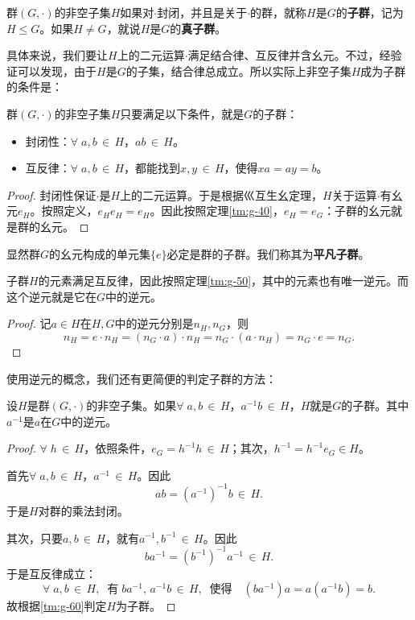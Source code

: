 \documentclass[12pt,UTF8,fontset=none]{ctexbook}
\begin{document}
\vspace{16pt}
\begin{df}[\textbf{子群}]
    群$(G,\cdot)$的非空子集$H$如果对$\cdot$封闭，并且是关于$\cdot$的群，就称$H$是$G$的\textbf{子群}，记为$H\leq G$。如果$H\neq G$，就说$H$是$G$的\textbf{真子群}。
\end{df}
具体来说，我们要让$H$上的二元运算$\cdot$满足结合律、互反律并含幺元。不过，经验证可以发现，由于$H$是$G$的子集，结合律总成立。所以实际上非空子集$H$成为子群的条件是：
\begin{tm} \label{tm:g-60}  
    群$(G,\cdot)$的非空子集$H$只要满足以下条件，就是$G$的子群：
    \begin{itemize}
        \item 封闭性：$\forall\;a,b\,\in\, H$，$ab \,\in\, H$。
        \item 互反律：$\forall\;a,b\,\in\, H$，都能找到$x,y\,\in\,H$，使得$xa = ay = b$。
    \end{itemize}
\end{tm}

\begin{proof}
    封闭性保证$\cdot$是$H$上的二元运算。于是根据巛互生幺定理，$H$关于运算$\cdot$有幺元$e_H$。按照定义，$e_He_H = e_H$。因此按照定理\ref{tm:g-40}，$e_H = e_G$：子群的幺元就是群的幺元。
\end{proof}

显然群$G$的幺元构成的单元集$\{e\}$必定是群的子群。我们称其为\textbf{平凡子群}。

子群$H$的元素满足互反律，因此按照定理\ref{tm:g-50}，其中的元素也有唯一逆元。而这个逆元就是它在$G$中的逆元。
\begin{proof}
    记$a\in H$在$H, G$中的逆元分别是$n_H,n_G$，则
    $$ n_H = e\cdot n_H = (n_G\cdot a)\cdot n_H = n_G\cdot (a\cdot n_H) = n_G\cdot e = n_G.$$
\end{proof}

使用逆元的概念，我们还有更简便的判定子群的方法：
\begin{tm} \label{tm:g-70}   
    设$H$是群$(G,\cdot)$的非空子集。如果$\forall\;a,b\,\in\, H$，$a^{-1}b\,\in\,H$，$H$就是$G$的子群。其中$a^{-1}$是$a$在$G$中的逆元。
\end{tm}
\begin{proof}
    $\forall \; h\,\in\,H$，依照条件，$e_G = h^{-1}h \,\in\, H$；其次，$h^{-1} = h^{-1}e_G\in H$。
    
    首先$\forall\;a,b\,\in\, H$，$a^{-1}\,\in\, H$。因此
    $$ ab = \left(a^{-1}\right)^{-1}b\, \in\, H. $$
    于是$H$对群的乘法封闭。

    其次，只要$a,b\,\in\, H$，就有$a^{-1}, b^{-1}\,\in\, H$。因此
    $$ba^{-1} = \left(b^{-1}\right)^{-1}a^{-1}\,\in\, H.$$
    于是互反律成立：
    $$ \forall \; a,b\,\in\,H, \;\;\mbox{有}\;ba^{-1},\,a^{-1}b\,\in\,H,\;\;\mbox{使得}\quad (ba^{-1})a = a(a^{-1}b) = b. $$
    故根据\ref{tm:g-60}判定$H$为子群。
\end{proof}
\end{document}
